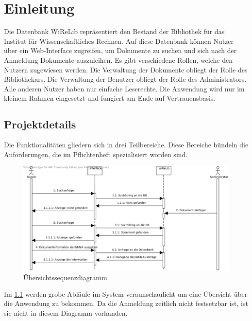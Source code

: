 
\chapter{Einleitung}
Die Datenbank WiReLib repräsentiert den Bestand der Bibliothek für das Institut für Wissenschaftliches Rechnen.
Auf diese Datenbank können Nutzer über ein Web-Interface zugreifen, um Dokumente zu suchen und sich nach der Anmeldung Dokumente auszuleihen.
Es gibt verschiedene Rollen, welche den Nutzern zugewiesen werden.
Die Verwaltung der Dokumente obliegt der Rolle des Bibliothekars.
Die Verwaltung der Benutzer obliegt der Rolle des Administrators.
Alle anderen Nutzer haben nur einfache Leserechte.
Die Anwendung wird nur im kleinem Rahmen eingesetzt und fungiert am Ende auf
Vertrauensbasis.

\section{Projektdetails}
Die Funktionalitäten gliedern sich in drei Teilbereiche.
Diese Bereiche bündeln die Anforderungen, die im Pflichtenheft spezialisiert
worden sind.

\begin{figure}[h]
\begin{center}
\includegraphics[width=0.8\linewidth]{bilder/Seq-Uebersicht.pdf}
\caption[Übersichtssequenzdiagramm]{Übersichtssequenzdiagramm}
\label{Seq-Übersicht}
\end{center}
\end{figure}

Im \ref{Seq-Übersicht}  werden grobe Abläufe im System veraunschaulicht um eine
Übersicht über die Anwendung zu bekommen.
Da die Anmeldung zeitlich nicht festsetzbar ist, ist sie nicht in diesem
Diagramm vorhanden.

